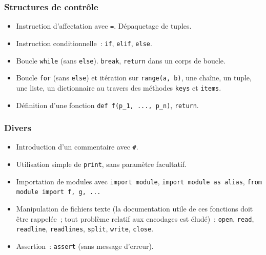 \documentclass[book]{magnoliaold}
\begin{document}
\subsubsection*{Structures de contrôle}
\begin{itemize}
\item Instruction d'affectation avec \verb|=|. Dépaquetage de tuples.
\item Instruction conditionnelle~: \verb|if|, \verb|elif|, \verb|else|.
\item Boucle \verb|while| (sans \verb|else|). \verb|break|, \verb|return| dans un corps de boucle.
\item Boucle \verb|for| (sans \verb|else|) et itération sur \verb|range(a, b)|, une chaîne, un tuple, une liste, un dictionnaire au travers des méthodes \verb|keys| et \verb|items|.
\item Définition d'une fonction \verb|def f(p_1, ..., p_n)|, \verb|return|.
\end{itemize}

\subsubsection*{Divers}
\begin{itemize}
\item Introduction d'un commentaire avec \verb|#|.
\item Utilisation simple de \verb|print|, sans paramètre facultatif.
\item Importation de modules avec \verb|import module|, \verb|import module as alias|, \verb|from module import f, g, ...|
\item Manipulation de fichiers texte (la documentation utile de ces fonctions doit être rappelée~; tout problème relatif aux encodages est éludé)~: \verb|open|, \verb|read|, \verb|readline|, \verb|readlines|, \verb|split|, \verb|write|, \verb|close|.
\item Assertion~: \verb|assert| (sans message d'erreur).
\end{itemize}
\end{document}
